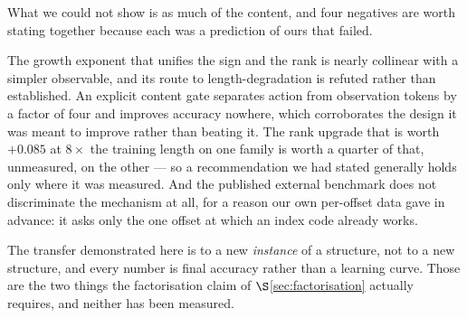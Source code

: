\documentclass[11pt]{article}
\begin{document}
What we could not show is as much of the content, and four negatives are worth
stating together because each was a prediction of ours that failed.

The growth exponent that unifies the sign and the rank is nearly collinear with a
simpler observable, and its route to length-degradation is refuted rather than
established. An explicit content gate separates action from observation tokens by a
factor of four and improves accuracy nowhere, which corroborates the design it was
meant to improve rather than beating it. The rank upgrade that is worth $+0.085$ at
$8\times$ the training length on one family is worth a quarter of that, unmeasured,
on the other --- so a
recommendation we had stated generally holds only where it was measured. And the
published external benchmark does not discriminate the mechanism at all, for a
reason our own per-offset data gave in advance: it asks only the one offset at which
an index code already works.

The transfer demonstrated here is to a new \emph{instance} of a structure, not to a
new structure, and every number is final accuracy rather than a learning curve.
Those are the two things the factorisation claim of $\S$\ref{sec:factorisation}
actually requires, and neither has been measured.
\end{document}
